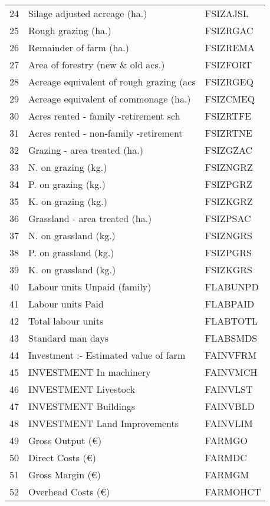 \documentclass{article}\usepackage{graphicx, color}
\begin{document}
\begin{flushleft}
\begin{table}[ht]
\begin{center}
\begin{tabular}{rll}
  24 & Silage adjusted acreage  (ha.) & FSIZAJSL \\ 
  25 & Rough grazing            (ha.) & FSIZRGAC \\ 
  26 & Remainder of farm        (ha.) & FSIZREMA \\ 
  27 & Area of forestry (new \& old acs.) & FSIZFORT \\ 
  28 & Acreage equivalent of rough grazing (acs & FSIZRGEQ \\ 
  29 & Acreage equivalent of commonage (ha.) & FSIZCMEQ \\ 
  30 & Acres rented - family -retirement sch & FSIZRTFE \\ 
  31 & Acres rented - non-family -retirement & FSIZRTNE \\ 
  32 & Grazing - area treated   (ha.) & FSIZGZAC \\ 
  33 & N. on grazing    (kg.) & FSIZNGRZ \\ 
  34 & P. on grazing    (kg.) & FSIZPGRZ \\ 
  35 & K. on grazing    (kg.) & FSIZKGRZ \\ 
  36 & Grassland - area treated (ha.) & FSIZPSAC \\ 
  37 & N. on grassland  (kg.) & FSIZNGRS \\ 
  38 & P. on grassland  (kg.) & FSIZPGRS \\ 
  39 & K. on grassland  (kg.) & FSIZKGRS \\ 
  40 & Labour units  Unpaid (family) & FLABUNPD \\ 
  41 & Labour units  Paid & FLABPAID \\ 
  42 & Total labour units & FLABTOTL \\ 
  43 & Standard man days & FLABSMDS \\ 
  44 & Investment :- Estimated value of farm & FAINVFRM \\ 
  45 & INVESTMENT     In machinery & FAINVMCH \\ 
  46 & INVESTMENT     Livestock & FAINVLST \\ 
  47 & INVESTMENT     Buildings & FAINVBLD \\ 
  48 & INVESTMENT     Land Improvements & FAINVLIM \\ 
  49 & Gross Output                     (€) & FARMGO \\ 
  50 & Direct Costs                     (€) & FARMDC \\ 
  51 & Gross Margin                     (€) & FARMGM \\ 
  52 & Overhead Costs                   (€) & FARMOHCT \\ 

\end{tabular}
\end{center}
\end{table}
\end{flushleft}
\end{document}
